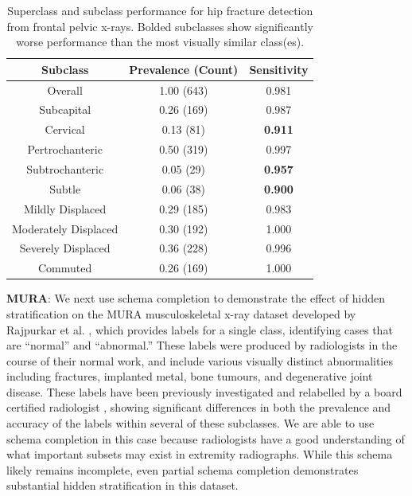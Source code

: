 \documentclass{article}
\begin{document}
\begin{table}[htb!]
\centering
\begin{tabular}{|c|c|c|}
\hline
 Subclass & Prevalence (Count) & Sensitivity \\
 \hline
 Overall & 1.00 (643) & 0.981  \\
 Subcapital & 0.26 (169) & 0.987   \\
 Cervical & 0.13 (81) & \textbf{0.911}\\
 Pertrochanteric & 0.50 (319)  & 0.997\\
 Subtrochanteric & 0.05 (29) & \textbf{0.957} \\
 Subtle & 0.06 (38) & \textbf{0.900}\\
 Mildly Displaced & 0.29 (185) & 0.983\\
 Moderately Displaced & 0.30 (192) & 1.000\\
 Severely Displaced & 0.36 (228) & 0.996\\
 Commuted & 0.26 (169) & 1.000 \\ 
 \hline
\end{tabular}
\caption{Superclass and subclass performance for hip fracture detection from frontal pelvic x-rays. Bolded subclasses show significantly worse performance than the most visually similar class(es).}
\label{tab:hip1}
\vspace{-6mm}
\end{table}

\textbf{MURA}: We next use schema completion to demonstrate the effect of hidden stratification on the MURA musculoskeletal x-ray dataset developed by Rajpurkar et al. \citep{Rajpurkar2017-rc}, which provides labels for a single class, identifying cases that are ``normal'' and ``abnormal.'' 
These labels were produced by radiologists in the course of their normal work, and include various visually distinct abnormalities including fractures, implanted metal, bone tumours, and degenerative joint disease. 
These labels have been previously investigated and relabelled by a board certified radiologist \citep{Oakden-Rayner2019-yi}, showing significant differences in both the prevalence and accuracy of the labels within several of these subclasses. 
We are able to use schema completion in this case because radiologists have a good understanding of what important subsets may exist in extremity radiographs.
While this schema likely remains incomplete, even partial schema completion demonstrates substantial hidden stratification in this dataset.
\end{document}
